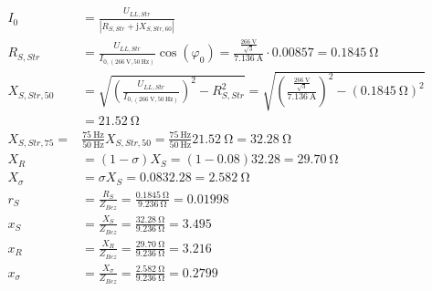 \documentclass[11pt,a4paper]{scrartcl}
\newcommand{\mybr}[1]{\left(#1\right)}
\renewcommand{\j}{\mathrm{j}}
\newcommand{\0}{_{\mybr{0}}}
\newcommand{\1}{_{\mybr{1}}}
\newcommand{\2}{_{\mybr{2}}}
\begin{document}
\subsection{}
\begin{align}
I_0&=\frac{U_{LL,Str}}{\left|R_{S,Str}+\j X_{S,Str,60}\right|}\\
R_{S,Str}&=\frac{U_{LL,Str}}{I_{0,\mybr{\SI{266}{\volt},\SI{50}{\hertz}}}}\cos\mybr{\varphi_0}=\frac{\frac{\SI{266}{\volt}}{\sqrt{3}}}{\SI{7.136}{\ampere}}\cdot\num{0.00857}=\SI{0.1845}{\ohm}\\
X_{S,Str,50}&=\sqrt{\mybr{\frac{U_{LL,Str}}{I_{0,\mybr{\SI{266}{\volt},\SI{50}{\hertz}}}}}^2-R_{S,Str}^2}=\sqrt{\mybr{\frac{\frac{\SI{266}{\volt}}{\sqrt{3}}}{\SI{7.136}{\ampere}}}^2-\mybr{\SI{0.1845}{\ohm}}^2}\\
&=\SI{21.52}{\ohm}\\
X_{S,Str,75}=&\frac{\SI{75}{\hertz}}{\SI{50}{\hertz}}X_{S,Str,50}=\frac{\SI{75}{\hertz}}{\SI{50}{\hertz}}\SI{21.52}{\ohm}=\SI{32.28}{\ohm}\\
X_R&=\mybr{1-\sigma}X_S=\mybr{1-\num{0.08}}\SI{32.28}=\SI{29.70}{\ohm}\\
X_\sigma&=\sigma X_S=\num{0.08}\SI{32.28}=\SI{2.582}{\ohm}\\
r_S&=\frac{R_S}{Z_{Bez}}=\frac{\SI{0.1845}{\ohm}}{\SI{9.236}{\ohm}}=\num{0.01998}\\
x_S&=\frac{X_S}{Z_{Bez}}=\frac{\SI{32.28}{\ohm}}{\SI{9.236}{\ohm}}=\num{3.495}\\
x_R&=\frac{X_R}{Z_{Bez}}=\frac{\SI{29.70}{\ohm}}{\SI{9.236}{\ohm}}=\num{3.216}\\
x_\sigma&=\frac{X_\sigma}{Z_{Bez}}=\frac{\SI{2.582}{\ohm}}{\SI{9.236}{\ohm}}=\num{0.2799}
\end{align}
\end{document}
